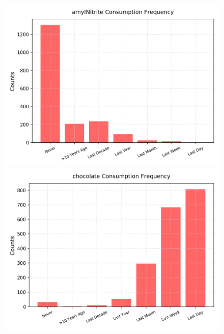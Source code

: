 \documentclass{article}
\begin{document}
\begin{figure}[h!]
\begin{minipage}[b]{0.32\textwidth}
	\end{minipage}
	\begin{minipage}[b]{0.32\textwidth}
		\includegraphics[width=\textwidth]{plots/drugsPlots/amylNitrite_freq.png}
	\end{minipage}
	\begin{minipage}[b]{0.32\textwidth}
	\includegraphics[width=\textwidth]{plots/drugsPlots/chocolate_freq.png}


\end{minipage}
\end{figure}
\end{document}
